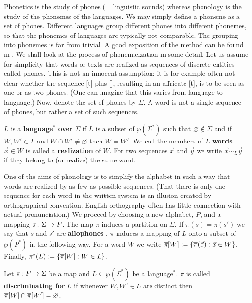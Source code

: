 Phonetics is the study of phones (= linguistic sounds) whereas 
phonology is the study of the phonemes of the languages. We may simply 
define a phoneme as a set of phones. Different languages group different
phones into different phonemes, so that the phonemes of languages
are typically not comparable. The grouping into phonemes is far
from trivial. A good exposition of the method can be found in
\cite{harris:structural}. We shall look at the process of
pho\-ne\-mi\-ci\-za\-tion in some detail. Let us assume for simplicity 
that words or texts are realized as sequences of discrete entities
called phones. This is not an innocent assumption: it is
for example often not clear whether the sequence [t] plus [\textesh],
resulting in an affricate [t\textesh], is to be seen as one or as 
two phones. (One can imagine that this varies from language to 
language.) Now, denote the set of phones by $\Sigma$. A word is not
a single sequence of phones, but rather a set of such sequences.
\begin{defn}
$L$ is a \textbf{language}${}^{\ast}$ \textbf{over} $\Sigma$ if $L$ is a
subset of $\wp(\Sigma^{\ast})$ such that $\varnothing \not\in \Sigma$
and if $W, W' \in L$ and $W \cap W' \neq \varnothing$ then $W = W'$.
We call the members of $L$ \textbf{words}. $\vec{x} \in W$ is called a
\textbf{realization} of $W$. For two sequences $\vec{x}$ and $\vec{y}$
we write $\vec{x} \sim_L \vec{y}$ if they belong to (or realize) the
same word.
\end{defn}
One of the aims of phonology is to simplify the alphabet in such a
way that words are realized by as few as possible sequences. (That 
there is only one sequence for each word in the written system is an 
illusion created by orthographical convention. English orthography 
often has little connection with actual pronunciation.) We proceed 
by choosing a new alphabet, 
$P$, and a mapping $\pi \colon \Sigma \rightarrow P$.  The map $\pi$ induces a 
partition on $\Sigma$. If $\pi(s) = \pi(s')$ we say that $s$ and $s'$ 
are \textbf{allophones}%
. $\pi$ induces a mapping of $L$ onto a subset 
of $\wp(P^{\ast})$ in the following way. For a word $W$ we write
$\overline{\pi}[W] := \{\overline{\pi}(\vec{x}) : \vec{x} \in W\}$. Finally,
$\pi^{\ast}(L) := \{\overline{\pi}[W] : W \in L\}$. 
\begin{defn}
Let $\pi \colon P \rightarrow \Sigma$ be a map and $L \subseteq \wp(\Sigma^{\ast})$
be a language${}^{\ast}$. $\pi$ is called \textbf{discriminating for}
$L$ if whenever $W, W' \in L$ are distinct then $\overline{\pi}[W] \cap
\overline{\pi}[W'] = \varnothing$.
\end{defn}

